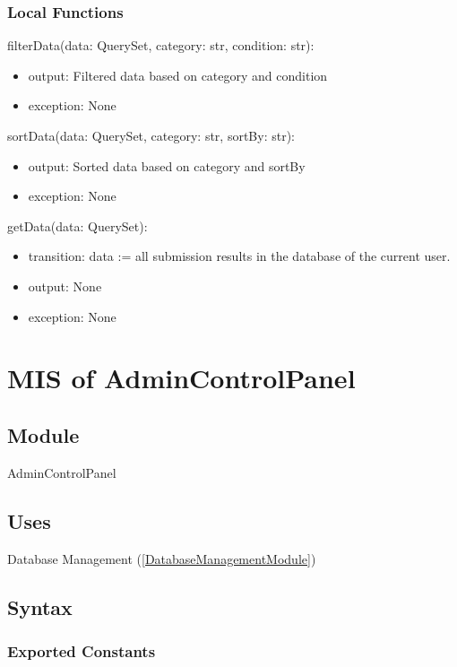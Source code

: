 \documentclass[12pt, titlepage]{article}
\begin{document}
\subsubsection{Local Functions}

\noindent filterData(data: QuerySet, category: str, condition: str):
\begin{itemize}
\item output: Filtered data based on category and condition
\item exception: None
\end{itemize}

\noindent sortData(data: QuerySet, category: str, sortBy: str):
\begin{itemize}
\item output: Sorted data based on category and sortBy
\item exception: None
\end{itemize}

\noindent getData(data: QuerySet):
\begin{itemize}
\item transition: data := all submission results in the database of the current user.
\item output: None
\item exception: None
\end{itemize}

\newpage

\section{MIS of AdminControlPanel} \label{AdminControlPanelModule}

\subsection{Module}

AdminControlPanel

\subsection{Uses}


Database Management (\ref{DatabaseManagementModule})

\subsection{Syntax}

\subsubsection{Exported Constants}
\end{document}
